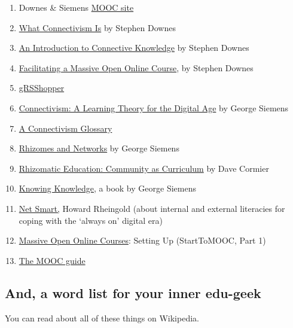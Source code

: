 \begin{enumerate}
\def\labelenumi{\arabic{enumi}.}
\item
  Downes \& Siemens \href{http://change.mooc.ca}{MOOC site}
\item
  \href{http://halfanhour.blogspot.com/2007/02/what-connectivism-is.html}{What
  Connectivism Is} by Stephen Downes
\item
  \href{http://www.downes.ca/post/33034}{An Introduction to Connective
  Knowledge} by Stephen Downes
\item
  \href{http://www.downes.ca/presentation/290}{Facilitating a Massive
  Open Online Course}, by Stephen Downes
\item
  \href{http://grsshopper.downes.ca/index.html}{gRSShopper}
\item
  \href{http://www.elearnspace.org/Articles/connectivism.htm}{Connectivism:
  A Learning Theory for the Digital Age} by George Siemens
\item
  \href{http://en.wikiversity.org/wiki/Connectivism_glossary}{A
  Connectivism Glossary}
\item
  \href{http://www.connectivism.ca/?p=329}{Rhizomes and Networks} by
  George Siemens
\item
  \href{http://innovateonline.info/pdf/vol4_issue5/Rhizomatic_Education-__Community_as_Curriculum.pdf}{Rhizomatic
  Education: Community as Curriculum} by Dave Cormier
\item
  \href{http://www.amazon.ca/Knowing-Knowledge-George-Siemens/dp/1430302305}{Knowing
  Knowledge}, a book by George Siemens
\item
  \href{http://www.amazon.com/Net-Smart-ebook/dp/B007D5UP9G}{Net Smart,}
  Howard Rheingold (about internal and external literacies for coping
  with the `always on' digital era)
\item
  \href{http://www.learningsolutionsmag.com/articles/886/}{Massive Open
  Online Courses}: Setting Up (StartToMOOC, Part 1)
\item
  \href{https://sites.google.com/site/themoocguide/}{The MOOC guide}
\end{enumerate}

\hypertarget{and-a-word-list-for-your-inner-edu-geek}{%
\subsection{And, a word list for your inner
edu-geek}\label{and-a-word-list-for-your-inner-edu-geek}}

You can read about all of these things on Wikipedia.

